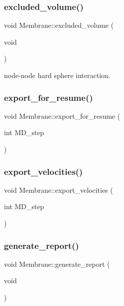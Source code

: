 \subsubsection{\texorpdfstring{excluded\_volume()}{excluded\_volume()}}
{\footnotesize\ttfamily void Membrane\+::excluded\+\_\+volume (\begin{DoxyParamCaption}\item[{void}]{ }\end{DoxyParamCaption})}



node-\/node hard sphere interaction. 

\mbox{\label{classMembrane_a45aaa9c0cbd3d22aa9b03e24480b69de}} 
\subsubsection{\texorpdfstring{export\_for\_resume()}{export\_for\_resume()}}
{\footnotesize\ttfamily void Membrane\+::export\+\_\+for\+\_\+resume (\begin{DoxyParamCaption}\item[{int}]{M\+D\+\_\+step }\end{DoxyParamCaption})}

\mbox{\label{classMembrane_ac71c4da5a974b65e764fff394a2f1eb4}} 
\subsubsection{\texorpdfstring{export\_velocities()}{export\_velocities()}}
{\footnotesize\ttfamily void Membrane\+::export\+\_\+velocities (\begin{DoxyParamCaption}\item[{int}]{M\+D\+\_\+step }\end{DoxyParamCaption})}

\mbox{\label{classMembrane_a36462fa0881cf8ee5a0c7268ae4fdd30}} 
\subsubsection{\texorpdfstring{generate\_report()}{generate\_report()}}
{\footnotesize\ttfamily void Membrane\+::generate\+\_\+report (\begin{DoxyParamCaption}\item[{void}]{ }\end{DoxyParamCaption})}

